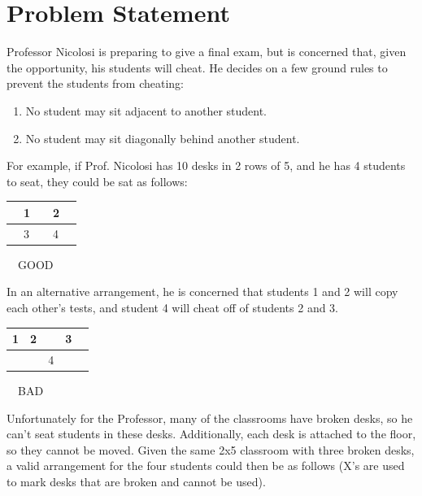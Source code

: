 \documentclass[11pt]{article}
\begin{document}
\pagestyle{fancy}


\section{Problem Statement}

Professor Nicolosi is preparing to give a final exam, but is concerned that,
given the opportunity, his students will cheat. He decides on a few ground
rules to prevent the students from cheating:
\begin{enumerate}
\item No student may sit adjacent to another student.
\item No student may sit diagonally behind another student.
\end{enumerate}
\smallskip
For example, if Prof. Nicolosi has 10 desks in 2 rows of 5,
and he has 4 students to seat, they could be sat as follows:

\begin{center}
\setlength{\tabcolsep}{8pt}
\renewcommand{\arraystretch}{1.5}
\begin{tabular}{ | m{6pt} | m{6pt} | m{6pt} | m{6pt} | m{6pt} | }
		\hline
 		& 1 & & 2 & \\ \hline
		& 3 & & 4 & \\
 		\hline
\end{tabular} \ \ GOOD
\end{center}
\smallskip
In an alternative arrangement, he is concerned that students 1 and 2 will copy
each other's tests, and student 4 will cheat off of students 2 and 3.

\begin{center}
\setlength{\tabcolsep}{8pt}
\renewcommand{\arraystretch}{1.5}
\begin{tabular}{ | m{6pt} | m{6pt} | m{6pt} | m{6pt} | m{6pt} | }
		\hline
 		1 & 2 & & 3 & \\ \hline
		& & 4 & & \\
 		\hline
\end{tabular} \ \ BAD
\end{center}
\bigskip
Unfortunately for the Professor, many of the classrooms have broken desks,
so he can't seat students in these desks. Additionally, each desk
is attached to the floor, so they cannot be moved. Given the same 2x5 classroom
with three broken desks, a valid arrangement for the four students could then be
as follows (X's are used to mark desks that are broken and cannot be used).
\end{document}
